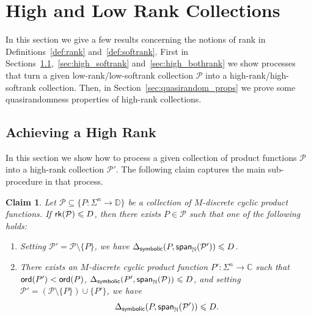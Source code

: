 \documentclass[11pt]{article}
\newtheorem{claim}[thm]{Claim}
\newcommand\spn{{\sf span}_{\mathbb{N}}}
\renewcommand\leq{\leqslant}
\begin{document}
    \section{High and Low Rank Collections}
    In this section we give a few results concerning the notions of rank in Definitions~\ref{def:rank} and~\ref{def:softrank}. First in Sections~\ref{sec:high_rank},~\ref{sec:high_softrank} and~\ref{sec:high_bothrank}   we show processes that turn a given low-rank/low-softrank collection $\mathcal{P}$ into a high-rank/high-softrank collection. Then, in Section~\ref{sec:quasirandom_props} we prove some quasirandomness properties of high-rank collections.
    \subsection{Achieving a High Rank}\label{sec:high_rank}
    In this section we show how to process a given collection of product functions $\mathcal{P}$ into a high-rank collection $\mathcal{P}'$. The following claim captures the main sub-procedure in that process. 
    \begin{claim}\label{claim:high_rank_process}
        Let $\mathcal{P}\subseteq \{P\colon\Sigma^n\to\mathbb{D}\}$ be a collection of $M$-discrete cyclic product functions. If ${\sf rk}(\mathcal{P})\leq D$, then there exists $P\in \mathcal{P}$ such that one of the following holds:
        \begin{enumerate}
            \item Setting $\mathcal{P}'=\mathcal{P}\setminus\{P\}$, we have $\Delta_{{\sf symbolic}}(P,\spn(\mathcal{P}'))\leq D$.
            \item There exists an $M$-discrete cyclic product function $P'\colon \Sigma^n\to\mathbb{C}$ such that
            ${\sf ord}(P')<{\sf ord}(P)$, $\Delta_{{\sf symbolic}}(P',\spn(\mathcal{P}))\leq D$, and setting $\mathcal{P}'=(\mathcal{P}\setminus\{P\})\cup\{P'\}$, we have 
            \[
            \Delta_{{\sf symbolic}}(P,\spn(\mathcal{P}'))\leq D.
            \]
        \end{enumerate}
    \end{claim}
\end{document}
